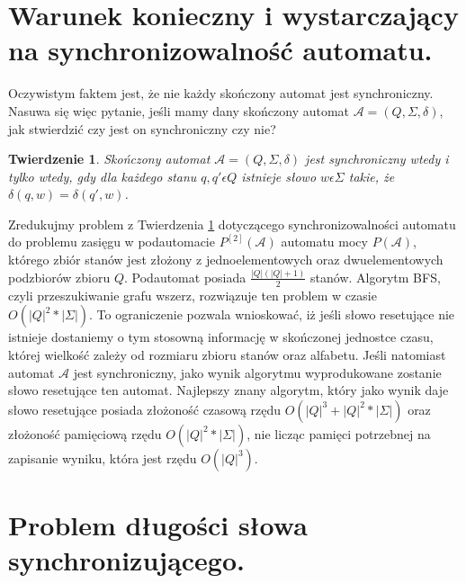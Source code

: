 \documentclass[12pt,a4paper]{article}
\newtheorem{twr}{Twierdzenie}[section]
\begin{document}
\newpage
\section{Warunek konieczny i wystarczaj\k{a}cy na synchronizowalno\'{s}\'{c} automatu.}

Oczywistym faktem jest, \.{z}e nie ka\.{z}dy sko\'{n}czony automat jest synchroniczny. Nasuwa si\k{e} wi\k{e}c pytanie, je\'{s}li mamy dany sko\'{n}czony automat $\mathscr{A}=(Q, \Sigma, \delta)$, jak stwierdzi\'{c} czy jest on synchroniczny czy nie?

\begin{twr}
\label{tw:twierdzenie1}
Sko\'{n}czony automat $\mathscr{A}=(Q, \Sigma, \delta)$ jest synchroniczny wtedy i tylko wtedy, gdy dla ka\.{z}dego stanu $q, q' \epsilon Q$ istnieje s{\l}owo $w \epsilon \Sigma$ takie, \.{z}e $\delta(q,w)=\delta(q',w)$.
\end{twr}

Zredukujmy problem z Twierdzenia \ref{tw:twierdzenie1} dotycz\k{a}cego synchronizowalno\'{s}ci automatu do problemu zasi\k{e}gu w podautomacie $P^{[2]}(\mathscr{A})$ automatu mocy $P(\mathscr{A})$, kt\'{o}rego zbi\'{o}r stan\'{o}w jest z{\l}o\.{z}ony z jednoelementowych oraz dwuelementowych podzbior\'{o}w zbioru $Q$. Podautomat posiada $\frac{|Q|(|Q|+1)}{2}$ stan\'{o}w. Algorytm BFS, czyli przeszukiwanie grafu wszerz, rozwi\k{a}zuje ten problem w czasie $O(|Q|^2*|\Sigma|)$. To ograniczenie pozwala wnioskowa\'{c}, i\.{z} je\'{s}li s{\l}owo resetuj\k{a}ce nie istnieje dostaniemy o tym stosown\k{a} informacj\k{e} w sko\'{n}czonej jednostce czasu, kt\'{o}rej wielko\'{s}\'{c} zale\.{z}y od rozmiaru zbioru stan\'{o}w oraz alfabetu. Je\'{s}li natomiast automat $\mathscr{A}$ jest synchroniczny, jako wynik algorytmu wyprodukowane zostanie s{\l}owo resetuj\k{a}ce ten automat. Najlepszy znany algorytm, kt\'{o}ry jako wynik daje s{\l}owo resetuj\k{a}ce posiada z{\l}o\.{z}ono\'{s}\'{c} czasow\k{a} rz\k{e}du $O(|Q|^3+|Q|^2*|\Sigma|)$ oraz z{\l}o\.{z}ono\'{s}\'{c} pami\k{e}ciow\k{a} rz\k{e}du $O(|Q|^2*|\Sigma|)$, nie licz\k{a}c pami\k{e}ci potrzebnej na zapisanie wyniku, kt\'{o}ra jest rz\k{e}du $O(|Q|^3)$.


\newpage
\section{Problem d{\l}ugo\'{s}ci s{\l}owa synchronizuj\k{a}cego.}
\end{document}
